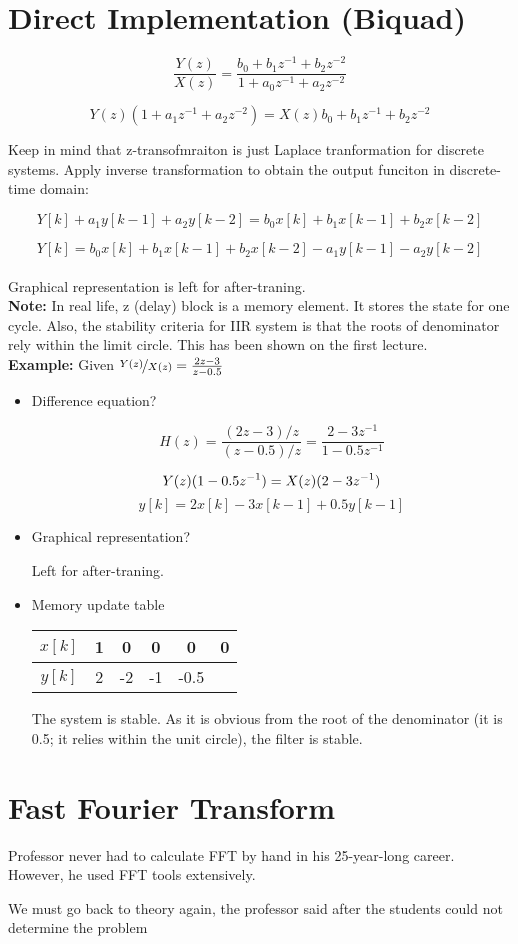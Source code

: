 \section{Direct Implementation (Biquad)}

$$\frac{Y(z)}{X(z)} = \frac{b_0 + b_1z^{-1}+b_2z^{-2}}{1 + a_0z^{-1} + a_2z^{-2}}$$

$$Y(z)(1 + a_1z^{-1} + a_2z^{-2}) = X(z)b_0 + b_1z^{-1}+b_2z^{-2}$$

Keep in mind that z-transofmraiton is just Laplace tranformation for discrete systems. Apply inverse transformation to obtain the output funciton in discrete-time domain:

$$Y[k] + a_1y[k-1] + a_2y[k-2] = b_0x[k] + b_1x[k-1]+b_2x[k-2]$$

$$Y[k] = b_0x[k] + b_1x[k-1]+b_2x[k-2] - a_1y[k-1] - a_2y[k-2]$$\\

Graphical representation is left for after-traning.\\

\textbf{Note:} In real life, z (delay) block is a memory element. It stores the state for one cycle. Also, the stability criteria for IIR system is that the roots of denominator rely within the limit circle. This has been shown on the first lecture. \\

\textbf{Example:} Given $\nicefrac{Y(z)}{X(z)} = \frac{2z-3}{z-0.5}$

\begin{itemize}
	\item Difference equation?

	$$ H(z) = \frac{(2z-3)/z}{(z-0.5)/z} = \frac{2 - 3z^{-1}}{1-0.5z^{-1}} $$

	$$ Y(z)(1 - 0.5z^{-1}) = X(z)(2-3z^{-1})$$
	$$ y[k] = 2x[k] - 3x[k-1] + 0.5y[k-1] $$

	\item Graphical representation?

	Left for after-traning.

	\item Memory update table
	\begin{center}
		\begin{tabular}{|c|c|c|c|c|c|}
			\hline
			$x[k]$ & 1 & 0 & 0 & 0 & 0 \\
			\hline
			$y[k]$ & 2 & -2 & -1 & -0.5 &  \\
			\hline
		\end{tabular}
	\end{center}

	The system is stable. As it is obvious from the root of the denominator (it is 0.5; it relies within the unit circle), the filter is stable.
\end{itemize}

\newpage

\section{Fast Fourier Transform}

Professor never had to calculate FFT by hand in his 25-year-long career. However, he used FFT tools extensively.

We must go back to theory again, the professor said after the students could not determine the problem